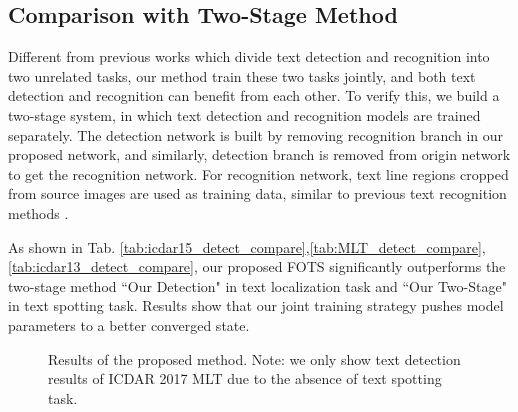 \documentclass[10pt,twocolumn,letterpaper]{article}
\begin{document}
\subsection{Comparison with Two-Stage Method}
\label{e2e_vs_2stage}
Different from previous works which divide text detection and recognition into two unrelated tasks, our method train these two tasks jointly, and both text detection and recognition can benefit from each other. To verify this, we build a two-stage system, in which text detection and recognition models are trained separately. The detection network is built by removing recognition branch in our proposed network, and similarly, detection branch is removed from origin network to get the recognition network. For recognition network, text line regions cropped from source images are used as training data, similar to previous text recognition methods \cite{shi2016crnn, he2016first, liu2016star}.

As shown in Tab. \ref{tab:icdar15_detect_compare},\ref{tab:MLT_detect_compare},\ref{tab:icdar13_detect_compare}, our proposed FOTS significantly outperforms the two-stage method ``Our Detection" in text localization task and ``Our Two-Stage" in text spotting task. Results show that our joint training strategy pushes model parameters to a better converged state.

\begin{figure*}[!ht]
\begin{center}
\end{center}
\vspace{-10pt}
\caption{Results of the proposed method. Note: we only show text detection results of ICDAR 2017 MLT due to the absence of text spotting task.}
\label{tab:result}
\end{figure*}
\end{document}
